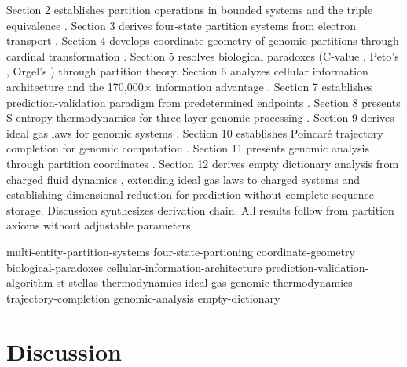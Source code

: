 \documentclass[11pt,a4paper]{article}
\theoremstyle{remark}
\begin{document}
Section 2 establishes partition operations in bounded systems and the triple equivalence \citep{poincare1890probleme, birkhoff1931proof}. Section 3 derives four-state partition systems from electron transport \citep{mitchell1961coupling, nicholls2013bioenergetics}. Section 4 develops coordinate geometry of genomic partitions through cardinal transformation \citep{nandy2006graphical, yau2003dna}. Section 5 resolves biological paradoxes (C-value \citep{gregory2001coincidence}, Peto's \citep{peto1977naturally}, Orgel's \citep{orgel1968evolution}) through partition theory. Section 6 analyzes cellular information architecture and the 170,000$\times$ information advantage \citep{shannon1948mathematical, elowitz2002stochastic}. Section 7 establishes prediction-validation paradigm from predetermined endpoints \citep{landauer1961irreversibility}. Section 8 presents S-entropy thermodynamics for three-layer genomic processing \citep{callen1985thermodynamics}. Section 9 derives ideal gas laws for genomic systems \citep{reif1965fundamentals}. Section 10 establishes Poincaré trajectory completion for genomic computation \citep{poincare1890probleme}. Section 11 presents genomic analysis through partition coordinates \citep{altschul1990basic, gusfield1997algorithms}. Section 12 derives empty dictionary analysis from charged fluid dynamics \citep{chen2016introduction, debye1923theory}, extending ideal gas laws to charged systems and establishing dimensional reduction for prediction without complete sequence storage. Discussion synthesizes derivation chain. All results follow from partition axioms without adjustable parameters.

{multi-entity-partition-systems}
{four-state-partioning}
{coordinate-geometry}
{biological-paradoxes}
{cellular-information-architecture}
{prediction-validation-algorithm}
{st-stellas-thermodynamics}
{ideal-gas-genomic-thermodynamics}
{trajectory-completion}
{genomic-analysis}
{empty-dictionary}

\section{Discussion}
\end{document}
